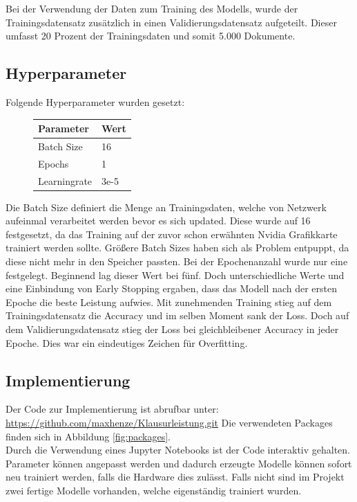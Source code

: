 \documentclass[DIV=13,fontsize=11pt]{scrartcl}
\begin{document}
Bei der Verwendung der Daten zum Training des Modells, wurde der Trainingsdatensatz zusätzlich in einen
Validierungsdatensatz aufgeteilt. Dieser umfasst 20 Prozent der Trainingsdaten und somit 5.000 Dokumente.

\subsection{Hyperparameter}

Folgende Hyperparameter wurden gesetzt:

\begin{figure}[H]
    \centering
    \begin{tabular}{ll}
        \toprule
        Parameter    & Wert \\
        \midrule
        Batch Size   & 16   \\
        Epochs       & 1    \\
        Learningrate & 3e-5 \\
        \bottomrule
    \end{tabular}
\end{figure}

Die Batch Size definiert die Menge an Trainingsdaten, welche von Netzwerk aufeinmal
verarbeitet werden bevor es sich updated. Diese wurde auf 16 festgesetzt, da das
Training auf der zuvor schon erwähnten Nvidia Grafikkarte trainiert werden sollte.
Größere Batch Sizes haben sich als Problem entpuppt, da diese nicht mehr in den
Speicher passten.
Bei der Epochenanzahl wurde nur eine festgelegt.
Beginnend lag dieser Wert bei fünf. Doch unterschiedliche Werte und eine Einbindung
von Early Stopping ergaben, dass das Modell nach der ersten Epoche die
beste Leistung aufwies. Mit zunehmenden Training stieg auf dem Trainingsdatensatz
die Accuracy und im selben Moment sank der Loss. Doch auf dem Validierungsdatensatz
stieg der Loss bei gleichbleibener Accuracy in jeder Epoche. Dies war ein eindeutiges
Zeichen für Overfitting.

\subsection{Implementierung}

Der Code zur Implementierung ist abrufbar unter: \url{https://github.com/maxhenze/Klausurleistung.git}
Die verwendeten Packages finden sich in Abbildung \ref{fig:packages}.\\

Durch die Verwendung eines Jupyter Notebooks ist der Code interaktiv gehalten.
Parameter können angepasst werden und dadurch erzeugte Modelle können sofort
neu trainiert werden, falls die Hardware dies zulässt. Falls nicht
sind im Projekt zwei fertige Modelle vorhanden, welche eigenständig trainiert wurden.\\
\end{document}
